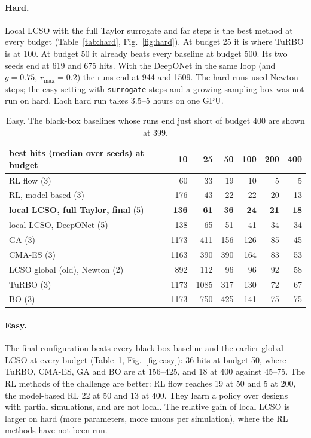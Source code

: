 \documentclass[11pt,a4paper]{article}
\begin{document}
\paragraph{Hard.} Local LCSO with the full Taylor surrogate and far steps is the best method at
every budget (Table~\ref{tab:hard}, Fig.~\ref{fig:hard}). At budget 25 it is where TuRBO is at
100. At budget 50 it already beats every baseline at budget 500. Its two seeds end at 619 and 675
hits. With the DeepONet in the same loop (and $g=0.75$, $r_\text{max}=0.2$) the runs end at 944 and
1509. The hard runs used Newton steps; the easy setting with \texttt{surrogate} steps and a
growing sampling box was not run on hard. Each hard run takes 3.5--5 hours on one GPU.

\begin{table}[h]\centering\small
\begin{tabular}{lrrrrrr}
\toprule
best hits (median over seeds) at budget & 10 & 25 & 50 & 100 & 200 & 400 \\
\midrule
RL flow (3) & 60 & 33 & 19 & 10 & 5 & 5 \\
RL, model-based (3) & 176 & 43 & 22 & 22 & 20 & 13 \\
\textbf{local LCSO, full Taylor, final} (5) & \textbf{136} & \textbf{61} & \textbf{36} & \textbf{24} & \textbf{21} & \textbf{18} \\
local LCSO, DeepONet (5) & 138 & 65 & 51 & 41 & 34 & 34 \\
GA (3) & 1173 & 411 & 156 & 126 & 85 & 45 \\
CMA-ES (3) & 1163 & 390 & 390 & 164 & 83 & 53 \\
LCSO global (old), Newton (2) & 892 & 112 & 96 & 96 & 92 & 58 \\
TuRBO (3) & 1173 & 1085 & 317 & 130 & 72 & 67 \\
BO (3) & 1173 & 750 & 425 & 141 & 75 & 75 \\
\bottomrule
\end{tabular}
\caption{Easy. The black-box baselines whose runs end just short of budget 400 are shown at 399.}
\label{tab:easy}
\end{table}

\paragraph{Easy.} The final configuration beats every black-box baseline and the earlier global
LCSO at every budget (Table~\ref{tab:easy}, Fig.~\ref{fig:easy}): 36 hits at budget 50, where
TuRBO, CMA-ES, GA and BO are at 156--425, and 18 at 400 against 45--75. The RL methods of the
challenge are better: RL flow reaches 19 at 50 and 5 at 200, the model-based RL 22 at 50 and 13 at
400. They learn a policy over designs with partial simulations, and are not local.
The relative gain of local LCSO is larger on hard (more parameters, more muons per simulation),
where the RL methods have not been run.
\end{document}
